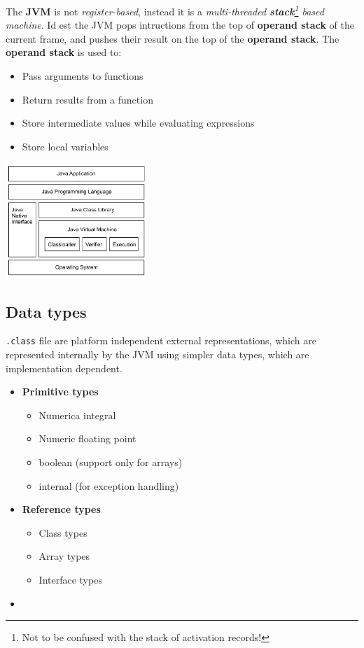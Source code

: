 The \textbf{JVM} is not \textit{register-based}, instead it is a \textit{multi-threaded \textbf{stack}\footnote{Not to be confused with the stack of activation records!} based machine}.
Id est the JVM pops intructions from the top of \textbf{operand stack} of the current frame, and pushes their result on the top of the \textbf{operand stack}. 
The \textbf{operand stack} is used to:
\begin{itemize}
    \item Pass arguments to functions
    \item Return results from a function
    \item Store intermediate values while evaluating expressions
    \item Store local variables
\end{itemize}
\begin{center}
    \includegraphics[width=0.4\textwidth]{images/Java_hierarchy.png}
\end{center}

\subsection{Data types}
\lstinline{.class} file are platform independent external representations, which are represented internally by the JVM using simpler data types, which are implementation dependent.
\begin{itemize}
    \item \textbf{Primitive types}
    \begin{itemize}
        \item Numerica integral
        \item Numeric floating point
        \item boolean (support only for arrays)
        \item internal (for exception handling)
    \end{itemize}
    \item \textbf{Reference types}
    \begin{itemize}
        \item Class types
        \item Array types
        \item Interface types
    \end{itemize}
    \item[] 
\end{itemize}

